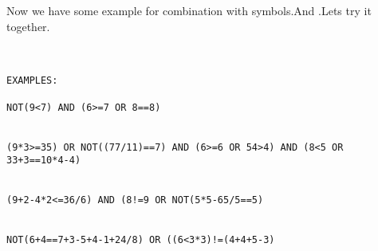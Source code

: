Now we have some example for combination with symbols.And .Lets try it together.\ \\ \

\begin{verbatim}

EXAMPLES:

NOT(9<7) AND (6>=7 OR 8==8)


(9*3>=35) OR NOT((77/11)==7) AND (6>=6 OR 54>4) AND (8<5 OR 33+3==10*4-4)


(9+2-4*2<=36/6) AND (8!=9 OR NOT(5*5-65/5==5)


NOT(6+4==7+3-5+4-1+24/8) OR ((6<3*3)!=(4+4+5-3)


\end{verbatim}\\ \ \\







